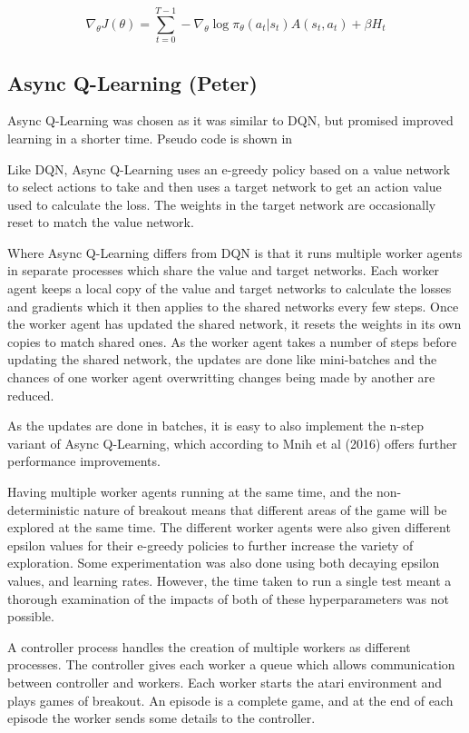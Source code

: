 \documentclass{article}
\begin{document}
\begin{equation}
\nabla_{\theta} J(\theta) = \sum_{t=0}^{T-1}-\nabla_{\theta}\log{\pi_{\theta}}(a_{t} | s_{t}) A(s_{t}, a_{t}) + \beta H_{t}
\end{equation}

\subsection{Async Q-Learning (Peter)}

Async Q-Learning was chosen as it was similar to DQN, but promised improved learning in a shorter time.
Pseudo code is shown in 

Like DQN, Async Q-Learning uses an e-greedy policy based on a value network to select actions to take and then uses a target network to get an action value used to calculate the loss.
The weights in the target network are occasionally reset to match the value network.

Where Async Q-Learning differs from DQN is that it runs multiple worker agents in separate processes which share the value and target networks.
Each worker agent keeps a local copy of the value and target networks to calculate the losses and gradients which it then applies to the shared networks every few steps.
Once the worker agent has updated the shared network, it resets the weights in its own copies to match shared ones.
As the worker agent takes a number of steps before updating the shared network, the updates are done like mini-batches and the chances of one worker agent overwritting changes being made by another are reduced.

As the updates are done in batches, it is easy to also implement the n-step variant of Async Q-Learning, which according to Mnih et al (2016) offers further performance improvements.

Having multiple worker agents running at the same time, and the non-deterministic nature of breakout means that different areas of the game will be explored at the same time.
The different worker agents were also given different epsilon values for their e-greedy policies to further increase the variety of exploration.
Some experimentation was also done using both decaying epsilon values, and learning rates. However, the time taken to run a single test meant a thorough examination of the impacts of both of these hyperparameters was not possible.

A controller process handles the creation of multiple workers as different processes.
The controller gives each worker a queue which allows communication between controller and workers.
Each worker starts the atari environment and plays games of breakout.
An episode is a complete game, and at the end of each episode the worker sends some details to the controller.
\end{document}
